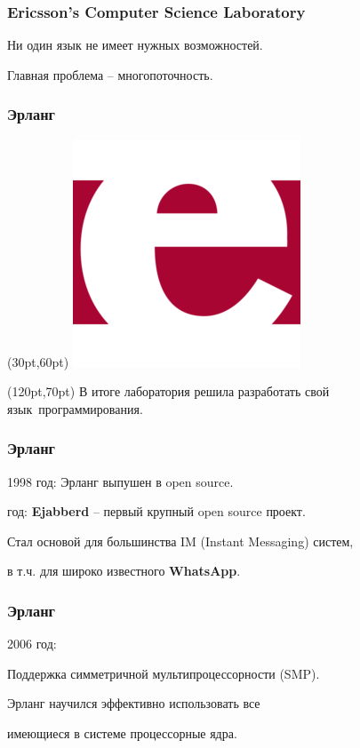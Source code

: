 \documentclass[10pt]{beamer}
\begin{document}
\begin{frame}
  \frametitle{Ericsson’s Computer Science Laboratory}
  Ни один язык не имеет нужных возможностей.
  \par \bigskip
  Главная проблема -- многопоточность.
\end{frame}

\begin{frame}
  \frametitle{Эрланг}
  \begin{textblock*}{75pt}(30pt,60pt)
    \includegraphics[scale=2.8]{erlang_logo}
  \end{textblock*}
  \begin{textblock*}{220pt}(120pt,70pt)
    В итоге лаборатория решила разработать свой язык~программирования.
  \end{textblock*}
\end{frame}

\begin{frame}
  \frametitle{Эрланг}
  1998 год: Эрланг выпушен в open source.
  \par {} год: \textbf{Ejabberd} -- первый крупный open source проект.
  \par \bigskip
  Стал основой для большинства IM (Instant Messaging) систем,
  \par \bigskip
  в т.ч. для широко известного \textbf{WhatsApp}.
\end{frame}

\begin{frame}
  \frametitle{Эрланг}
  2006 год:
  \par \bigskip
  Поддержка симметричной мультипроцессорности (SMP).
  \par \bigskip
  Эрланг научился эффективно использовать все
  \par \bigskip
  имеющиеся в системе процессорные ядра.
\end{frame}
\end{document}
